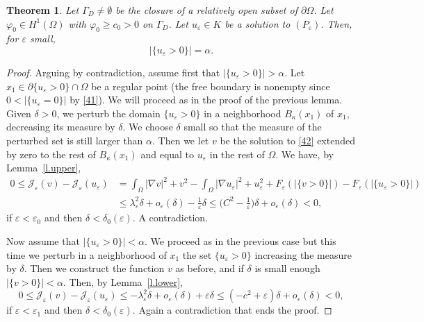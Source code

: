 \documentclass[11pt]{amsart}
\newtheorem{theorem}{Theorem}[section]
\theoremstyle{definition}
\theoremstyle{remark}
\numberwithin{equation}{section}
\newcommand{\cJ}{\mathcal{J}}
\begin{document}
\begin{theorem}\label{t.alpha}
Let $\Gamma_D\neq\emptyset$ be the closure of a relatively open subset of $\partial\Omega$. Let $\varphi_0\in H^1(\Omega)$ with $\varphi_0\ge c_0>0$ on $\Gamma_D$. Let $u_\varepsilon\in K$ be a solution to $(P_\varepsilon)$. Then, for $\varepsilon$ small,
\begin{equation}\label{43}
|\{u_\varepsilon>0\}|=\alpha.
\end{equation}
\end{theorem}

\begin{proof}
Arguing by contradiction, assume first that $|\{u_\varepsilon>0\}|>\alpha$. Let $x_1\in\partial\{u_\varepsilon>0\}\cap\Omega$ be a regular point (the free boundary is nonempty since $0<|\{u_\varepsilon=0\}|$ by \eqref{41}). We will proceed as in the proof of the previous lemma. Given $\delta>0$, we perturb the domain $\{u_\varepsilon>0\}$ in a neighborhood $B_\kappa(x_1)$ of $x_1$, decreasing its measure by $\delta$. We choose $\delta$ small so that the measure of the perturbed set is still larger than $\alpha$. Then we let $v$ be the solution to \eqref{42} extended by zero to the rest of $B_\kappa(x_1)$ and equal to $u_\varepsilon$ in the rest of $\Omega$. We have, by Lemma~\ref{l.upper},
\begin{align*}
0\le\cJ_\varepsilon(v)-\cJ_\varepsilon(u_\varepsilon)&=\int_\Omega|\nabla v|^2+v^2-\int_\Omega|\nabla u_\varepsilon|^2+u_\varepsilon^2+F_\varepsilon(|\{v>0\}|)-F_\varepsilon(|\{u_\varepsilon>0\}|)\\
&\le\lambda_\varepsilon^2\delta+o_\varepsilon(\delta)-\frac1\varepsilon\delta\le\Big(C^2-\frac1\varepsilon\Big)\delta+o_\varepsilon(\delta)<0,
\end{align*}
if $\varepsilon<\varepsilon_0$ and then $\delta<\delta_0(\varepsilon)$. A contradiction.

Now assume that $|\{u_\varepsilon>0\}|<\alpha$. We proceed as in the previous case but this time we perturb in a neighborhood of $x_1$ the set $\{u_\varepsilon>0\}$ increasing the measure by $\delta$. Then we construct the function $v$ as before, and if $\delta$ is small enough $|\{v>0\}|<\alpha$. Then, by Lemma~\ref{l.lower},
\[
0\le\cJ_\varepsilon(v)-\cJ_\varepsilon(u_\varepsilon)\le-\lambda_\varepsilon^2\delta+o_\varepsilon(\delta)+\varepsilon\delta\le(-c^2+\varepsilon)\delta+o_\varepsilon(\delta)<0,
\]
if $\varepsilon<\varepsilon_1$ and then $\delta<\delta_0(\varepsilon)$. Again a contradiction that ends the proof.
\end{proof}
\end{document}
